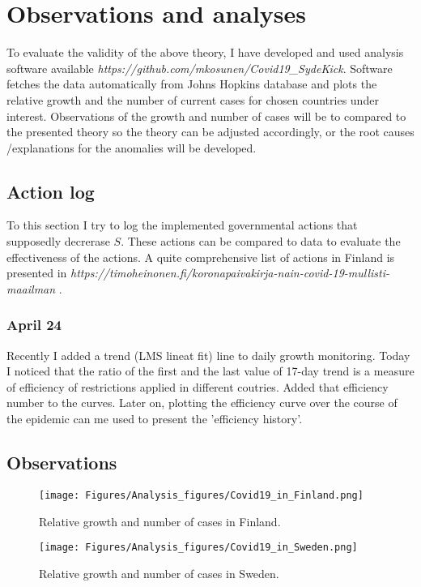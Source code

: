 \chapter{Observations and analyses}\label{chap:observations}
To evaluate the validity of the above theory, I have developed and used analysis software
available \emph{https://github.com/mkosunen/Covid19\_SydeKick}. Software
fetches the data automatically from Johns Hopkins database and plots the
relative growth and the number of current cases for chosen countries under
interest. Observations of the growth and number of cases will be to compared
to the presented theory so the theory can be adjusted accordingly, or the
root causes /explanations for the anomalies will be developed. 

\section{Action log}
To this section I try to log the implemented governmental actions that
supposedly decrerase $S$. These actions can be compared to data to evaluate
the effectiveness of the actions. A quite comprehensive list of actions in
Finland is presented in
\emph{https://timoheinonen.fi/koronapaivakirja-nain-covid-19-mullisti-maailman}
.

\subsection*{April 24 } 
Recently I added a trend (LMS lineat fit) line to daily growth monitoring. Today I noticed that
the ratio of the first and the last value of 17-day trend is a measure of
efficiency of restrictions applied in different coutries. Added that
efficiency number to the curves. Later on, plotting the efficiency curve over
the course of the epidemic can me used to present the 'efficiency history'.

\section{Observations}

\begin{figure}
    \centering
    \texttt{[image: Figures/Analysis\_figures/Covid19\_in\_Finland.png]}
    \caption{Relative growth and number of cases in Finland.}\label{fig:Finland}
\end{figure}

\begin{figure}
    \centering
    \texttt{[image: Figures/Analysis\_figures/Covid19\_in\_Sweden.png]}
    \caption{Relative growth and number of cases in Sweden.}\label{fig:Sweden}
\end{figure}

